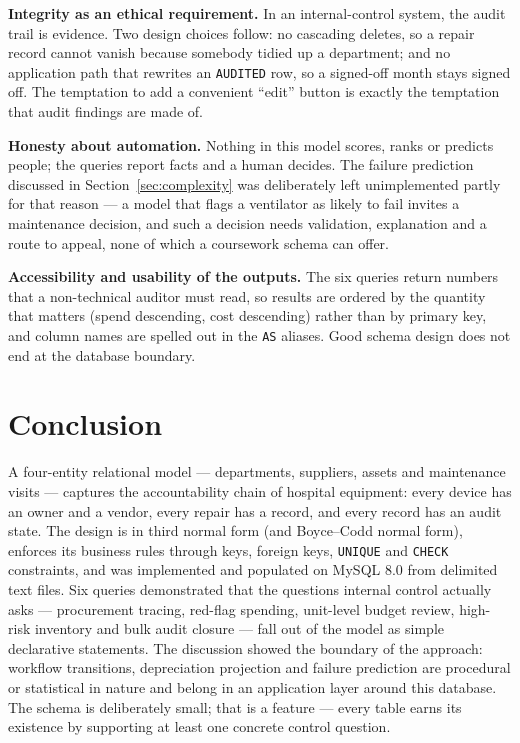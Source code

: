 \documentclass[conference]{IEEEtran}
\begin{document}
\textbf{Integrity as an ethical requirement.} In an internal-control system,
the audit trail is evidence. Two design choices follow: no cascading deletes,
so a repair record cannot vanish because somebody tidied up a department; and
no application path that rewrites an \texttt{AUDITED} row, so a signed-off
month stays signed off. The temptation to add a convenient ``edit'' button is
exactly the temptation that audit findings are made of.

\textbf{Honesty about automation.} Nothing in this model scores, ranks or
predicts people; the queries report facts and a human decides. The failure
prediction discussed in Section~\ref{sec:complexity} was deliberately left unimplemented
partly for that reason --- a model that flags a ventilator as likely to fail
invites a maintenance decision, and such a decision needs validation,
explanation and a route to appeal, none of which a coursework schema can
offer.

\textbf{Accessibility and usability of the outputs.} The six queries return
numbers that a non-technical auditor must read, so results are ordered by the
quantity that matters (spend descending, cost descending) rather than by
primary key, and column names are spelled out in the \texttt{AS} aliases.
Good schema design does not end at the database boundary.

\section{Conclusion}
A four-entity relational model --- departments, suppliers, assets and
maintenance visits --- captures the accountability chain of hospital
equipment: every device has an owner and a vendor, every repair has a
record, and every record has an audit state. The design is in third normal
form (and Boyce--Codd normal form), enforces its business rules through keys,
foreign keys, \texttt{UNIQUE} and \texttt{CHECK}
constraints, and was implemented and populated on MySQL 8.0 from delimited
text files. Six queries demonstrated that the questions internal control
actually asks --- procurement tracing, red-flag spending, unit-level budget
review, high-risk inventory and bulk audit closure --- fall out of the model
as simple declarative statements. The discussion showed the boundary of the
approach: workflow transitions, depreciation projection and failure
prediction are procedural or statistical in nature and belong in an
application layer around this database. The schema is deliberately small;
that is a feature --- every table earns its existence by supporting at least
one concrete control question.
\end{document}
